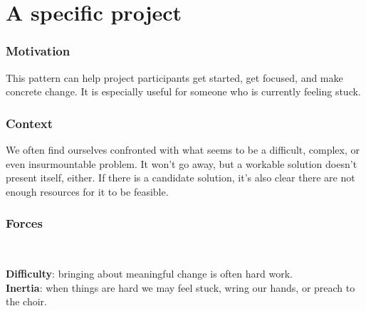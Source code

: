 \section{A specific project}\label{sec:A specific project}
\subsubsection*{Motivation} This pattern can help project participants get started, get focused, and make concrete change.  It is especially useful for someone who is currently feeling stuck.



\subsubsection*{Context}
We often find ourselves confronted with what seems to be a difficult, complex, or even insurmountable problem.  It won't go away, but a workable solution doesn't present itself, either.  If there is a candidate solution, it's also clear there are not enough resources for it to be feasible.

\subsubsection*{Forces}~
\parbox[t]{.85\textwidth}{
\textbf{Difficulty}: bringing about meaningful change is often hard work.\\
\textbf{Inertia}: when things are hard we may feel stuck, wring our hands, or preach to the choir.
}

